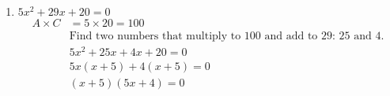 \documentclass[12pt]{article}
\begin{document}
\begin{enumerate}
    \item $5x^2 + 29x + 20 = 0$
    \begin{align*}
        A \times C & = 5 \times 20 = 100 \\
        & \text{Find two numbers that multiply to 100 and add to 29: } 25 \text{ and } 4. \\
        & 5x^2 + 25x + 4x + 20 = 0 \\
        & 5x(x + 5) + 4(x + 5) = 0 \\
        & (x + 5)(5x + 4) = 0
    \end{align*}
\end{enumerate}
\end{document}
